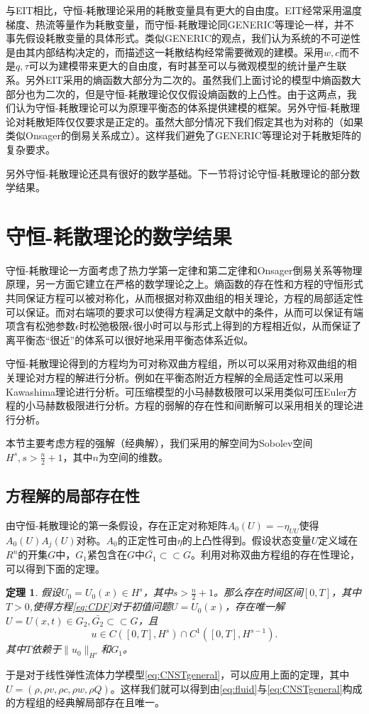 \documentclass{article}
\newtheorem{theorem}{定理}
\begin{document}
与EIT相比，守恒-耗散理论采用的耗散变量具有更大的自由度。EIT经常采用温度梯度、热流等量作为耗散变量，而守恒-耗散理论同GENERIC等理论一样，并不事先假设耗散变量的具体形式。类似GENERIC的观点，我们认为系统的不可逆性是由其内部结构决定的，而描述这一耗散结构经常需要微观的建模。采用$w,c$而不是$q,\tau$可以为建模带来更大的自由度，有时甚至可以与微观模型的统计量产生联系。另外EIT采用的熵函数大部分为二次的。虽然我们上面讨论的模型中熵函数大部分也为二次的，但是守恒-耗散理论仅仅假设熵函数的上凸性。由于这两点，我们认为守恒-耗散理论可以为原理平衡态的体系提供建模的框架。另外守恒-耗散理论对耗散矩阵仅仅要求是正定的。虽然大部分情况下我们假定其也为对称的（如果类似Onsager的倒易关系成立）。这样我们避免了GENERIC等理论对于耗散矩阵的复杂要求。

另外守恒-耗散理论还具有很好的数学基础。下一节将讨论守恒-耗散理论的部分数学结果。

	\section{守恒-耗散理论的数学结果}
	守恒-耗散理论一方面考虑了热力学第一定律和第二定律和Onsager倒易关系等物理原理，另一方面它建立在严格的数学理论之上。熵函数的存在性和方程的守恒形式共同保证方程可以被对称化，从而根据对称双曲组的相关理论，方程的局部适定性可以保证。而对右端项的要求可以使得方程满足文献\cite{}中的条件，从而可以保证有端项含有松弛参数$\epsilon$时松弛极限$\epsilon$很小时可以与形式上得到的方程相近似，从而保证了离平衡态“很近”的体系可以很好地采用平衡态体系近似。

	守恒-耗散理论得到的方程均为可对称双曲方程组，所以可以采用对称双曲组的相关理论对方程的解进行分析。例如在平衡态附近方程解的全局适定性可以采用Kawashima理论进行分析\cite{}。可压缩模型的小马赫数极限可以采用类似可压Euler方程的小马赫数极限进行分析\cite{}。方程的弱解的存在性和间断解可以采用相关的理论进行分析\cite{}。

	本节主要考虑方程的强解（经典解），我们采用的解空间为Sobolev空间$H^s, s > \frac{n}{2}+1$，其中$n$为空间的维数。

	\subsection{方程解的局部存在性}
	由守恒-耗散理论的第一条假设，存在正定对称矩阵$A_0(U)  = -\eta_{UU}$使得$A_0(U) A_j(U)$对称。$A_0$的正定性可由$\eta$的上凸性得到。假设状态变量$U$定义域在$R^{n}$的开集$G$中，$G_1$紧包含在$G$中$\bar{G_1} \subset\subset G$。利用对称双曲方程组的存在性理论，可以得到下面的定理\cite{}。
	\begin{theorem}
		假设$U_0 =U_0(x) \in H^{s}$，其中$s>\frac{n}{2} +1$。那么存在时间区间$[0,T]$，其中$T>0$,使得方程\eqref{eq:CDF}对于初值问题$U=U_0(x)$，存在唯一解$U = U(x,t) \in G_2, \bar{G_2} \subset \subset G$，且
		\begin{equation*}
			u \in C([0,T],H^s) \cap C^1([0,T],H^{s-1}).
		\end{equation*}
		其中$T$依赖于$\|u_0\|_{H^s}$和$G_1$。
	\end{theorem}
	于是对于线性弹性流体力学模型\eqref{eq:CNSTgeneral}，可以应用上面的定理，其中$U = (\rho,\rho v, \rho c,\rho w, \rho Q)$。这样我们就可以得到由\eqref{eq:fluid}与\eqref{eq:CNSTgeneral}构成的方程组的经典解局部存在且唯一。
\end{document}
